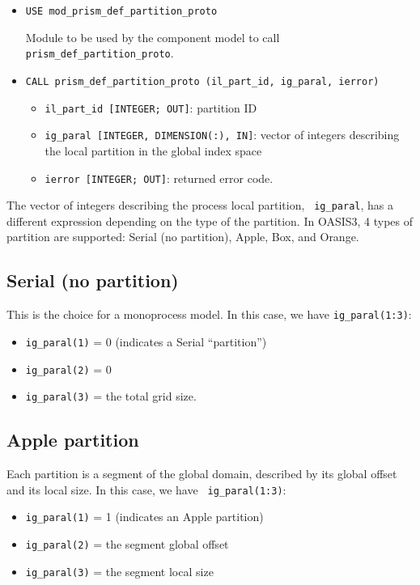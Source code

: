 \begin{itemize}

\item {\tt USE mod\_prism\_def\_partition\_proto}

Module to be used by the component model to call {\tt
  prism\_def\_partition\_proto}.

\item {\tt CALL prism\_def\_partition\_proto (il\_part\_id,
   ig\_paral, ierror)}
   \begin{itemize}
   \item {\tt il\_part\_id [INTEGER; OUT]}: partition ID 
   \item {\tt ig\_paral [INTEGER, DIMENSION(:), IN]}: vector of
   integers describing the local partition in the global index space
   \item {\tt ierror [INTEGER; OUT]}: returned error code.
   \end{itemize}
\end{itemize} 

The vector of integers describing the process local partition, {\tt
ig\_paral}, has a different expression depending on the type of the
partition. In OASIS3, 4 types of partition are supported: Serial (no
partition), Apple, Box, and Orange.
 
\subsection{Serial (no partition)}

This is the choice for a monoprocess model. In this case, we have 
{\tt ig\_paral(1:3)}:
\begin{itemize}
 \item {\tt ig\_paral(1)} = 0 (indicates a Serial ``partition'')
 \item {\tt ig\_paral(2)} = 0
 \item {\tt ig\_paral(3)} = the total grid size.
\end{itemize}

\subsection{Apple partition} 

Each partition is a segment of the global domain, described by its
global offset and its local size. In this case, we have {\tt
ig\_paral(1:3)}:
\begin{itemize}
 \item {\tt ig\_paral(1)} = 1 (indicates an Apple partition)
 \item {\tt ig\_paral(2)} = the segment global offset
 \item {\tt ig\_paral(3)} = the segment local size
\end{itemize}

